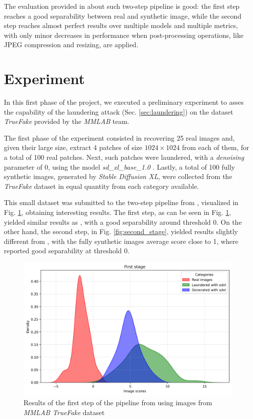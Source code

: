 \documentclass[conference]{IEEEtran} %
\begin{document}
        The evaluation provided in \cite{mandelli2024synthetic} about such two-step pipeline is good: the first step reaches a good separability between real and synthetic image, while the second step reaches almost perfect results over multiple models and multiple metrics, with only minor decreases in performance when post-processing operations, like JPEG compression and resizing, are applied.

\section{Experiment}
    In this first phase of the project, we executed a preliminary experiment to asses the capability of the laundering attack (Sec. \ref{sec:laundering}) on the dataset \textit{TrueFake} provided by the \textit{MMLAB} team.

    The first phase of the experiment consisted in recovering 25 real images and, given their large size, extract 4 patches of size $1024\times1024$ from each of them, for a total of 100 real patches. Next, such patches were laundered, with a \textit{denoising} parameter of 0, using the model \textit{sd\_xl\_base\_1.0} \cite{sdxl_base_1_0}. Lastly, a total of 100 fully synthetic images, generated by \textit{Stable Diffusion XL}, were collected from the \textit{TrueFake} dataset in equal quantity from each category available.

    This small dataset was submitted to the two-step pipeline from \cite{mandelli2024synthetic}, visualized in Fig. \ref{fig:first_stage}, obtaining interesting results. The first step, as can be seen in Fig. \ref{fig:first_stage}, yielded similar results as \cite{mandelli2024synthetic}, with a good separability around threshold 0. On the other hand, the second step, in Fig. \ref{fig:second_stage}, yielded results slightly different from \cite{mandelli2024synthetic}, with the fully synthetic images average score close to 1, where \cite{mandelli2024synthetic} reported good separability at threshold 0. 

    \begin{figure}[h]
        \centering
        \includegraphics[width=0.95\linewidth]{Img/first_stage.png}
        \caption{Results of the first step of the pipeline from \cite{mandelli2024synthetic} using images from \textit{MMLAB TrueFake} dataset}
        \label{fig:first_stage}
    \end{figure}
\end{document}
